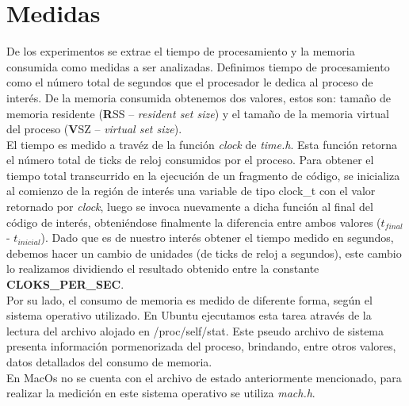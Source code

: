 \section{Medidas}
De los experimentos se extrae el tiempo de procesamiento y la memoria consumida como medidas a ser analizadas.
Definimos tiempo de procesamiento como el número total de segundos que el procesador le dedica al proceso de interés.
De la memoria consumida obtenemos dos valores, estos son: tamaño de memoria residente ({\textbf RSS} – {\it resident set size}) y el tamaño de la memoria virtual del proceso ({\textbf VSZ} – {\textit{virtual set size}).\\
El tiempo es medido a travéz de la función {\it clock} de {\it time.h}. Esta función retorna el número total de ticks de reloj consumidos por el proceso. Para obtener el tiempo total transcurrido en la ejecución de un fragmento de código, se inicializa al comienzo de la región de interés una variable de tipo clock\_t  con el valor retornado por {\it clock}, luego se invoca nuevamente a dicha función al final del código de interés, obteniéndose finalmente la diferencia entre ambos valores ($t_{final}$ - $t_{inicial}$). Dado que es de nuestro interés obtener el tiempo medido en segundos, debemos hacer un cambio de unidades (de ticks de reloj a segundos), este cambio lo realizamos dividiendo el resultado obtenido entre la constante {\bf CLOKS\_PER\_SEC}.\\
Por su lado, el consumo de memoria es medido de diferente forma, según el sistema operativo utilizado. En Ubuntu ejecutamos esta tarea através de la lectura del archivo alojado en /proc/self/stat. Este pseudo archivo de sistema presenta información pormenorizada del proceso, brindando, entre otros valores, datos detallados del consumo de memoria.  \\
En MacOs no se cuenta con el archivo de estado anteriormente mencionado, para realizar la medición en este sistema operativo se utiliza {\it mach.h}.
}
